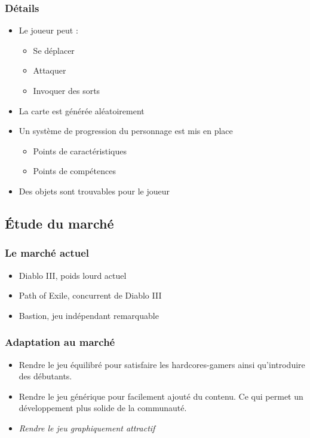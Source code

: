 \documentclass{beamer}
\begin{document}
\begin{frame}
\frametitle{Détails}
\begin{itemize}
	\item Le joueur peut :
	\begin{itemize}
		\item Se déplacer
		\item Attaquer
		\item Invoquer des sorts
	\end{itemize}
	\item La carte est générée aléatoirement
	\item Un système de progression du personnage est mis en place
	\begin{itemize}
		\item Points de caractéristiques
		\item Points de compétences
	\end{itemize}
	\item Des objets sont trouvables pour le joueur
\end{itemize}
\end{frame}

\subsection{Étude du marché}
\begin{frame}
\frametitle{Le marché actuel}
\begin{itemize}
	\item Diablo III, poids lourd actuel
	\item Path of Exile, concurrent de Diablo III
	\item Bastion, jeu indépendant remarquable
\end{itemize}
\end{frame}

\begin{frame}
\frametitle{Adaptation au marché}
\begin{itemize}
	\item Rendre le jeu équilibré pour satisfaire les hardcores-gamers ainsi qu'introduire des débutants.
	\item Rendre le jeu générique pour facilement ajouté du contenu. Ce qui permet un développement plus solide de la communauté.
	\item \textit{Rendre le jeu graphiquement attractif}
\end{itemize}
\end{frame}

\end{document}
